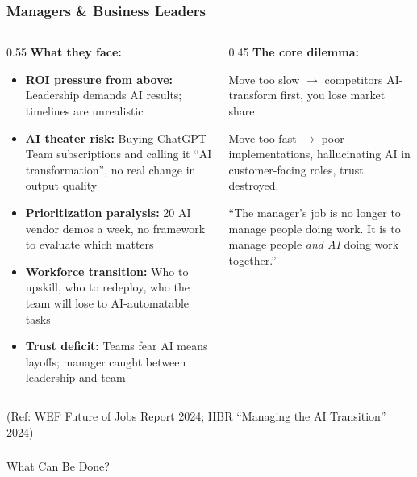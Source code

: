 \begin{frame}[fragile]\frametitle{Managers \& Business Leaders}

\begin{columns}
    \begin{column}[T]{0.55\linewidth}
\textbf{What they face:}
\begin{itemize}
\item \textbf{ROI pressure from above:} Leadership demands AI results; timelines are unrealistic
\item \textbf{AI theater risk:} Buying ChatGPT Team subscriptions and calling it ``AI transformation'', no real change in output quality
\item \textbf{Prioritization paralysis:} 20 AI vendor demos a week, no framework to evaluate which matters
\item \textbf{Workforce transition:} Who to upskill, who to redeploy, who the team will lose to AI-automatable tasks
\item \textbf{Trust deficit:} Teams fear AI means layoffs; manager caught between leadership and team
\end{itemize}
    \end{column}
    \begin{column}[T]{0.45\linewidth}
\textbf{The core dilemma:}

\vspace{0.2cm}
Move too slow $\rightarrow$ competitors AI-transform first, you lose market share.

\vspace{0.2cm}
Move too fast $\rightarrow$ poor implementations, hallucinating AI in customer-facing roles, trust destroyed.

\vspace{0.3cm}
{\small ``The manager's job is no longer to manage people doing work. It is to manage people \textit{and AI} doing work together.''}
    \end{column}
\end{columns}

{\tiny (Ref: WEF Future of Jobs Report 2024; HBR ``Managing the AI Transition'' 2024)}
\end{frame}


\begin{frame}[fragile]\frametitle{}

\begin{center}
{\Large What Can Be Done?}
\end{center}

\end{frame}


